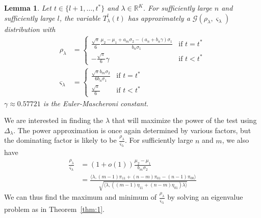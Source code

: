 \documentclass[draftcls]{IEEEtran}
\newtheorem{lemma}[theorem]{Lemma}
\theoremstyle{definition}
\begin{document}
\begin{lemma}
  \label{lem:2}
  Let $t \in \{l+1, \dots, t^{*}\}$ and $\lambda \in
  \mathbb{R}^{K}$. For sufficiently large $n$ and sufficiently large
  $l$, the variable $T_{\lambda}^{l}(t)$ has approximately a
  $\mathcal{G}(\rho_{\lambda}, \varsigma_{\lambda})$ distribution with
\begin{align}
  \label{eq:8}
  \rho_{\lambda} &= \begin{cases}
    \frac{\sqrt{\pi}}{6} \frac{\mu_2 - \mu_1 + a_m\sigma_2 - (a_n + b_n
      \gamma)\sigma_1}{b_n \sigma_1} & \text{if $t =
        t^{*}$} \\
      - \frac{ \sqrt{\pi}}{6} \gamma & \text{if $t < t^{*}$}
  \end{cases}\\
  \varsigma_{\lambda} &= \begin{cases}
    \frac{\sqrt{\pi} b_m \sigma_2}{6 b_n \sigma_1} & \text{if $t =
      t^{*}$} \\
    \frac{\sqrt{\pi}}{6} & \text{if $t < t^{*}$}
    \end{cases}
\end{align}
$\gamma \approx 0.57721$ is the Euler-Mascheroni constant.
\end{lemma}
We are interested in finding the $\lambda$ that will maximize the
power of the test using $\Delta_{\lambda}$. The power approximation is
once again determined by various factors, but the dominating factor is
likely to be $\tfrac{\rho_\lambda}{\varsigma_\lambda}$. For sufficiently large $n$
and $m$, we also have
\begin{equation*}
  \begin{split}
  \frac{\rho_\lambda}{\varsigma_\lambda} &= (1 + o(1)) \frac{\mu_2 - \mu_1}{b_m
    \sigma_ 2} \\ &= \frac{\langle \lambda, (m-1)\pi_{11} + (n-m)\pi_{01} -
    (n-1) \pi_{00} \rangle}{\sqrt{\langle \lambda, ((m-1) \eta_{11} +
    (n-m)\eta_{01}) \lambda \rangle}}
  \end{split}
\end{equation*}
We can thus find the maximum and minimum of
$\tfrac{\rho_{\lambda}}{\varsigma_{\lambda}}$ by solving an 
eigenvalue problem as in Theorem~\ref{thm:1}. 
\appendices
\end{document}
